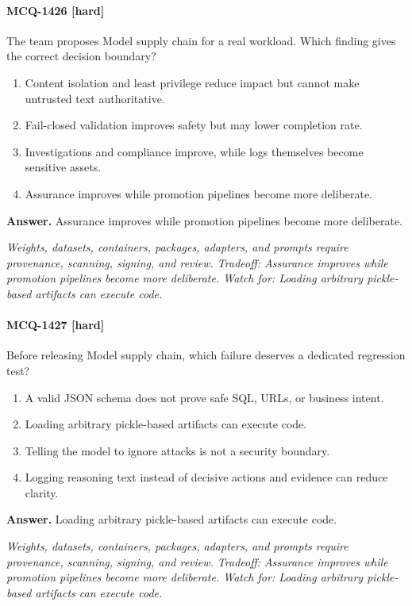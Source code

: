 \paragraph{MCQ-1426 [hard]} The team proposes Model supply chain for a real workload. Which finding gives the correct decision boundary?
\begin{enumerate}[label=\Alph*.]
\item Content isolation and least privilege reduce impact but cannot make untrusted text authoritative.
\item Fail-closed validation improves safety but may lower completion rate.
\item Investigations and compliance improve, while logs themselves become sensitive assets.
\item Assurance improves while promotion pipelines become more deliberate.
\end{enumerate}
\noindent\textbf{Answer.} Assurance improves while promotion pipelines become more deliberate.
\par\textit{Weights, datasets, containers, packages, adapters, and prompts require provenance, scanning, signing, and review. Tradeoff: Assurance improves while promotion pipelines become more deliberate. Watch for: Loading arbitrary pickle-based artifacts can execute code.}
\paragraph{MCQ-1427 [hard]} Before releasing Model supply chain, which failure deserves a dedicated regression test?
\begin{enumerate}[label=\Alph*.]
\item A valid JSON schema does not prove safe SQL, URLs, or business intent.
\item Loading arbitrary pickle-based artifacts can execute code.
\item Telling the model to ignore attacks is not a security boundary.
\item Logging reasoning text instead of decisive actions and evidence can reduce clarity.
\end{enumerate}
\noindent\textbf{Answer.} Loading arbitrary pickle-based artifacts can execute code.
\par\textit{Weights, datasets, containers, packages, adapters, and prompts require provenance, scanning, signing, and review. Tradeoff: Assurance improves while promotion pipelines become more deliberate. Watch for: Loading arbitrary pickle-based artifacts can execute code.}
